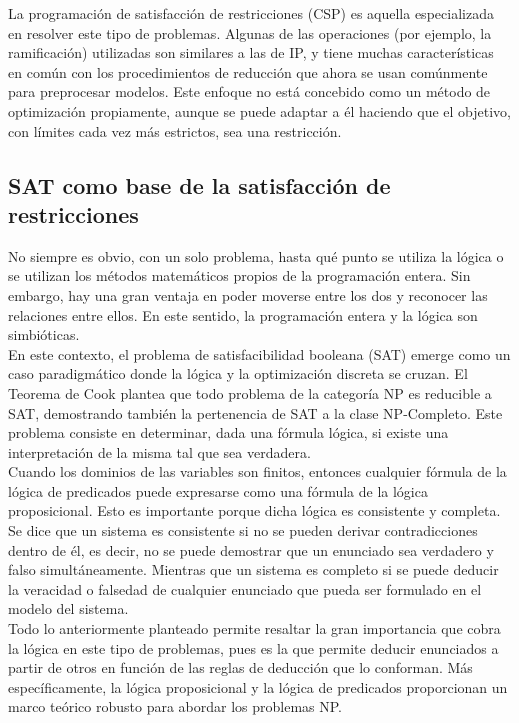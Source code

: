 \documentclass[12pt]{report}
\begin{document}
La programación de satisfacción de restricciones (CSP) es aquella especializada en resolver este tipo de problemas. Algunas de las operaciones (por ejemplo, la ramificación) utilizadas son similares a las de IP, y tiene muchas características en común con los procedimientos de reducción que ahora se usan comúnmente para preprocesar modelos. Este enfoque no está concebido como un método de optimización propiamente, aunque se puede adaptar a él haciendo que el objetivo, con límites cada vez más estrictos, sea una restricción.

\subsection{SAT como base de la satisfacción de restricciones}

No siempre es obvio, con un solo problema, hasta qué punto se utiliza la lógica o se utilizan los métodos matemáticos propios de la programación entera. Sin embargo, hay una gran ventaja en poder moverse entre los dos y reconocer las relaciones entre ellos. En este sentido, la programación entera y la lógica son simbióticas.\cite{Williams}\\

En este contexto, el problema de satisfacibilidad booleana (SAT) emerge como un caso paradigmático donde la lógica y la optimización discreta se cruzan. El Teorema de Cook \cite{NPC} plantea que todo problema de la categoría NP es reducible a SAT, demostrando también la pertenencia de SAT a la clase NP-Completo. Este problema consiste en determinar, dada una fórmula lógica, si existe una interpretación de la misma tal que sea verdadera.\\ 

Cuando los dominios de las variables son finitos, entonces cualquier fórmula de la lógica de predicados puede expresarse como una fórmula de la lógica proposicional. Esto es importante porque dicha lógica es consistente y completa. Se dice que un sistema es consistente si no se pueden derivar contradicciones dentro de él, es decir, no se puede demostrar que un enunciado sea verdadero y falso simultáneamente. Mientras que un sistema es completo si se puede deducir la veracidad o falsedad de cualquier enunciado que pueda ser formulado en el modelo del sistema. \\

Todo lo anteriormente planteado permite resaltar la gran importancia que cobra la lógica en este tipo de problemas, pues es la que permite deducir enunciados a partir de otros en función de las reglas de deducción que lo conforman. Más específicamente, la lógica proposicional y la lógica de predicados proporcionan un marco teórico robusto para abordar los problemas NP.\\
\end{document}
